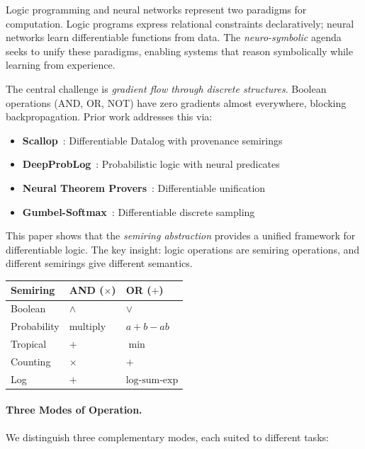 \documentclass[11pt,a4paper]{article}
\begin{document}
Logic programming and neural networks represent two paradigms for computation.
Logic programs express relational constraints declaratively; neural networks learn differentiable functions from data.
The \emph{neuro-symbolic} agenda seeks to unify these paradigms, enabling systems that reason symbolically while learning from experience.

The central challenge is \emph{gradient flow through discrete structures}.
Boolean operations (AND, OR, NOT) have zero gradients almost everywhere, blocking backpropagation.
Prior work addresses this via:
\begin{itemize}
  \item \textbf{Scallop}~\cite{scallop_chirho}: Differentiable Datalog with provenance semirings
  \item \textbf{DeepProbLog}~\cite{deepproblog_chirho}: Probabilistic logic with neural predicates
  \item \textbf{Neural Theorem Provers}~\cite{neural_theorem_provers_chirho}: Differentiable unification
  \item \textbf{Gumbel-Softmax}~\cite{gumbel_softmax_chirho}: Differentiable discrete sampling
\end{itemize}

This paper shows that the \emph{semiring abstraction} provides a unified framework for differentiable logic.
The key insight: logic operations are semiring operations, and different semirings give different semantics.

\begin{center}
\begin{tabular}{lll}
\toprule
\textbf{Semiring} & \textbf{AND ($\times$)} & \textbf{OR ($+$)} \\
\midrule
Boolean & $\land$ & $\lor$ \\
Probability & multiply & $a + b - ab$ \\
Tropical & $+$ & $\min$ \\
Counting & $\times$ & $+$ \\
Log & $+$ & $\text{log-sum-exp}$ \\
\bottomrule
\end{tabular}
\end{center}

\paragraph{Three Modes of Operation.}
We distinguish three complementary modes, each suited to different tasks:
\end{document}
